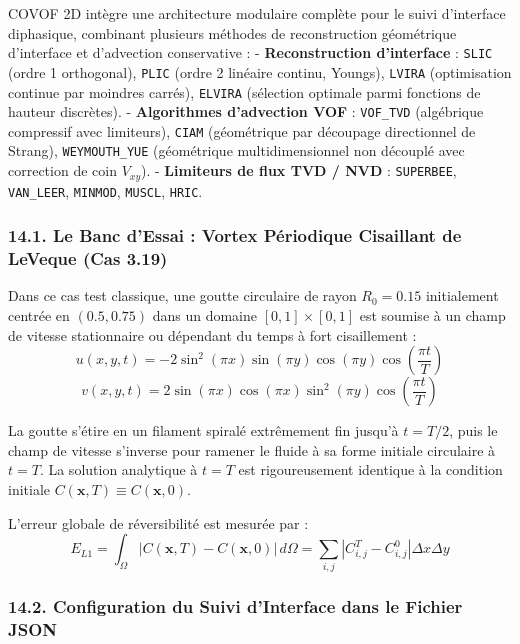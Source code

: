 \documentclass[
  french,
]{article}
\begin{document}
COVOF 2D intègre une architecture modulaire complète pour le suivi
d'interface diphasique, combinant plusieurs méthodes de reconstruction
géométrique d'interface et d'advection conservative : -
\textbf{Reconstruction d'interface} : \texttt{SLIC} (ordre 1
orthogonal), \texttt{PLIC} (ordre 2 linéaire continu, Youngs),
\texttt{LVIRA} (optimisation continue par moindres carrés),
\texttt{ELVIRA} (sélection optimale parmi fonctions de hauteur
discrètes). - \textbf{Algorithmes d'advection VOF} : \texttt{VOF\_TVD}
(algébrique compressif avec limiteurs), \texttt{CIAM} (géométrique par
découpage directionnel de Strang), \texttt{WEYMOUTH\_YUE} (géométrique
multidimensionnel non découplé avec correction de coin \(V_{xy}\)). -
\textbf{Limiteurs de flux TVD / NVD} : \texttt{SUPERBEE},
\texttt{VAN\_LEER}, \texttt{MINMOD}, \texttt{MUSCL}, \texttt{HRIC}.

\subsubsection{14.1. Le Banc d'Essai : Vortex Périodique Cisaillant de
LeVeque (Cas
3.19)}\label{le-banc-dessai-vortex-puxe9riodique-cisaillant-de-leveque-cas-3.19}

Dans ce cas test classique, une goutte circulaire de rayon
\(R_0 = 0.15\) initialement centrée en \((0.5, 0.75)\) dans un domaine
\([0, 1] \times [0, 1]\) est soumise à un champ de vitesse stationnaire
ou dépendant du temps à fort cisaillement :
\[u(x, y, t) = -2 \sin^2(\pi x) \sin(\pi y) \cos(\pi y) \cos\left(\frac{\pi t}{T}\right)\]
\[v(x, y, t) = 2 \sin(\pi x) \cos(\pi x) \sin^2(\pi y) \cos\left(\frac{\pi t}{T}\right)\]

La goutte s'étire en un filament spiralé extrêmement fin jusqu'à
\(t = T/2\), puis le champ de vitesse s'inverse pour ramener le fluide à
sa forme initiale circulaire à \(t = T\). La solution analytique à
\(t = T\) est rigoureusement identique à la condition initiale
\(C(\mathbf{x}, T) \equiv C(\mathbf{x}, 0)\).

L'erreur globale de réversibilité est mesurée par :
\[E_{L1} = \int_\Omega |C(\mathbf{x}, T) - C(\mathbf{x}, 0)| \, d\Omega = \sum_{i, j} |C_{i, j}^T - C_{i, j}^0| \Delta x \Delta y\]

\subsubsection{14.2. Configuration du Suivi d'Interface dans le Fichier
JSON}\label{configuration-du-suivi-dinterface-dans-le-fichier-json}
\end{document}
